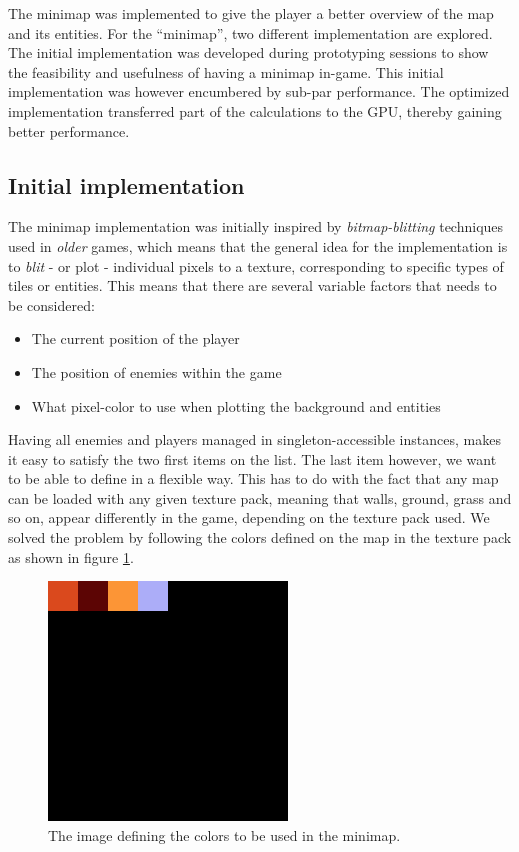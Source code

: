 The minimap was implemented to give the player a better overview of the map and its entities.
For the ``minimap'', two different implementation are explored. 
The initial implementation was developed during prototyping sessions to show the feasibility and usefulness of having a minimap in-game. 
This initial implementation was however encumbered by sub-par performance.
The optimized implementation transferred part of the calculations to the GPU, thereby gaining better performance.

\subsection{Initial implementation}
The minimap implementation was initially inspired by \textit{bitmap-blitting}
techniques used in \textit{older} games\cite{bitmap-blitting}, which means that the general idea for
the implementation is to \textit{blit} - or plot - individual pixels to a
texture, corresponding to specific types of tiles or entities. This means that
there are several variable factors that needs to be considered:
\begin{itemize}
    \item The current position of the player
    \item The position of enemies within the game 
    \item What pixel-color to use when plotting the background and entities
\end{itemize}
Having all enemies and players managed in singleton-accessible instances,
makes it easy to satisfy the two first items on the list. The last item
however, we want to be able to define in a flexible way. This
has to do with the fact that any map can be loaded with any given
texture pack, meaning that walls, ground, grass and so on, appear differently
in the game, depending on the texture pack used.
We solved the problem by following the colors defined on the map in the texture pack as shown in figure \ref{minimap:colordefinition}.
\\
\begin{figure}
	\centering
    \includegraphics[scale=.5]{figures/minimap/minimap_colors.png}
    \caption{The image defining the colors to be used in the minimap.}
    \label{minimap:colordefinition}
\end{figure}

